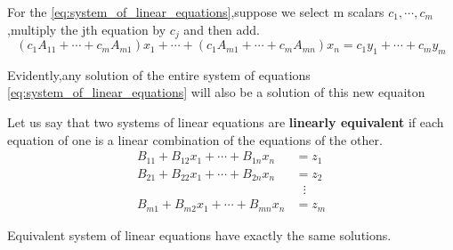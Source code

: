 \begin{definition}
	For the \ref{eq:system_of_linear_equations},suppose we select m scalars $c_1,\cdots,c_m$,multiply the jth equation by $c_j$ and then add.
	\begin{displaymath}
		(c_1A_{11}+\cdots+c_mA_{m1})x_1+\cdots+(c_1A_{m1}+\cdots+c_mA_{mn})x_n = c_1y_1+\cdots+c_my_m
	\end{displaymath}
\end{definition}

\begin{note}
	Evidently,any solution of the entire system of equations \ref{eq:system_of_linear_equations} will also be a solution of this new equaiton
\end{note}
\newpage
\begin{definition}
	Let us say that two systems of linear equations are \textbf{linearly equivalent} if each equation of one is a linear combination of the equations of the other.
	\begin{equation}
		\begin{aligned}
			B_{11}+B_{12}x_1+\cdots+B_{1n}x_n & = z_1           \\
			B_{21}+B_{22}x_1+\cdots+B_{2n}x_n & = z_2           \\
			                                  & \,\,\,\, \vdots \\
			B_{m1}+B_{m2}x_1+\cdots+B_{mn}x_n & = z_m
		\end{aligned}
		\label{eq:linear_equivalent}
	\end{equation}
\end{definition}

\begin{theorem}
	Equivalent system of linear equations have exactly the same solutions.
\end{theorem}

